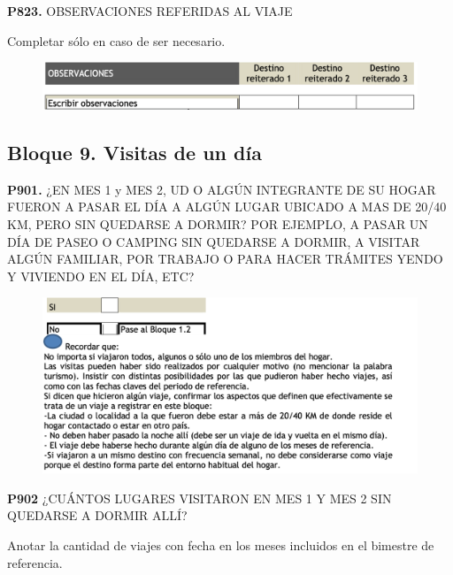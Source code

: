 \documentclass[
  openany]{book}
\begin{document}
\textbf{P823.} OBSERVACIONES REFERIDAS AL VIAJE

Completar sólo en caso de ser necesario.

\begin{figure}

{\centering \includegraphics[width=1\linewidth]{imagenes/figura6-281} 

}

\end{figure}

\hypertarget{bloque-9.-visitas-de-un-duxeda}{%
\subsection{Bloque 9. Visitas de un día}\label{bloque-9.-visitas-de-un-duxeda}}

\textbf{P901.} ¿EN MES 1 y MES 2, UD O ALGÚN INTEGRANTE DE SU HOGAR FUERON A PASAR EL DÍA A ALGÚN LUGAR UBICADO A MAS DE 20/40 KM, PERO SIN QUEDARSE A DORMIR? POR EJEMPLO, A PASAR UN DÍA DE PASEO O CAMPING SIN QUEDARSE A DORMIR, A VISITAR ALGÚN FAMILIAR, POR TRABAJO O PARA HACER TRÁMITES YENDO Y VIVIENDO EN EL DÍA, ETC?

\begin{figure}

{\centering \includegraphics[width=1\linewidth]{imagenes/figura6-282} 

}

\end{figure}

\textbf{P902} ¿CUÁNTOS LUGARES VISITARON EN MES 1 Y MES 2 SIN QUEDARSE A DORMIR ALLÍ?

Anotar la cantidad de viajes con fecha en los meses incluidos en el bimestre de referencia.
\end{document}
